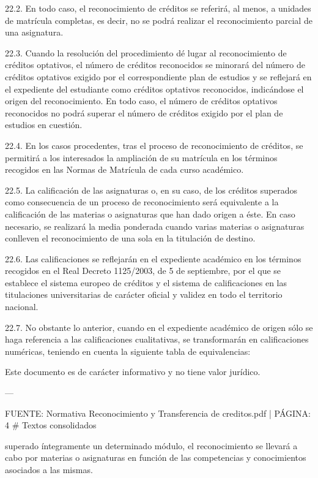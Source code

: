 \documentclass{article}
\begin{document}
\begin{itemize}
\begin{itemize}
\begin{scriptsize}
                  22.2. En todo caso, el reconocimiento de créditos se referirá, al menos, a unidades de matrícula completas, es decir, no se podrá realizar el reconocimiento parcial de una asignatura.

                  22.3. Cuando la resolución del procedimiento dé lugar al reconocimiento de créditos optativos, el número de créditos reconocidos se minorará del número de créditos optativos exigido por el correspondiente plan de estudios y se reflejará en el expediente del estudiante como créditos optativos reconocidos, indicándose el origen del reconocimiento. En todo caso, el número de créditos optativos reconocidos no podrá superar el número de créditos exigido por el plan de estudios en cuestión.

                  22.4. En los casos procedentes, tras el proceso de reconocimiento de créditos, se permitirá a los interesados la ampliación de su matrícula en los términos recogidos en las Normas de Matrícula de cada curso académico.

                  22.5. La calificación de las asignaturas o, en su caso, de los créditos superados como consecuencia de un proceso de reconocimiento será equivalente a la calificación de las materias o asignaturas que han dado origen a éste. En caso necesario, se realizará la media ponderada cuando varias materias o asignaturas conlleven el reconocimiento de una sola en la titulación de destino.

                  22.6. Las calificaciones se reflejarán en el expediente académico en los términos recogidos en el Real Decreto 1125/2003, de 5 de septiembre, por el que se establece el sistema europeo de créditos y el sistema de calificaciones en las titulaciones universitarias de carácter oficial y validez en todo el territorio nacional.

                  22.7. No obstante lo anterior, cuando en el expediente académico de origen sólo se haga referencia a las calificaciones cualitativas, se transformarán en calificaciones numéricas, teniendo en cuenta la siguiente tabla de equivalencias:

                  Este documento es de carácter informativo y no tiene valor jurídico.

                  ---

                  FUENTE: Normativa Reconocimiento y Transferencia de creditos.pdf | PÁGINA: 4
                  \# Textos consolidados

                  superado íntegramente un determinado módulo, el reconocimiento se llevará a cabo por materias o asignaturas en función de las competencias y conocimientos asociados a las mismas.


\end{scriptsize}
\end{itemize}
\end{itemize}
\end{document}
